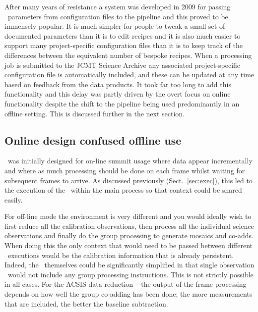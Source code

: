 \documentclass[final,authoryear,5p,times,twocolumn]{elsarticle}
\newcommand*\secref[1]{Sect.~\ref{#1}}
\begin{document}
After many years of resistance a system was developed in 2009 for
passing \recipe\ parameters from configuration files to the pipeline
and this proved to be immensely popular. It is much simpler for people
to tweak a small set of documented parameters than it is to edit
recipes and it is also much easier to support many project-specific
configuration files than it is to keep track of the differences
between the equivalent number of bespoke recipes. When a processing
job is submitted to the JCMT Science Archive any associated
project-specific configuration file is automatically included, and
these can be updated at any time based on feedback from the data
products. It took far too long to add this functionality and this
delay was partly driven by the overt focus on online functionality
despite the shift to the pipeline being used predominantly in an
offline setting. This is discussed further in the next section.

\subsection{Online design confused offline use}
\label{sec:onvoff}

\oracdr\ was initially designed for on-line summit usage where data
appear incrementally and where as much processing should be done on
each frame whilst waiting for subsequent frames to arrive. As
discussed previously (\secref{sec:exec}), this led to the
execution of the \recipe\ within the main process so that context
could be shared easily.

For off-line mode the environment is very different and you would
ideally wish to first reduce all the calibration observations, then
process all the individual science observations and finally do the
group processing to generate mosaics and co-adds. When doing this the
only context that would need to be passed between different \recipe\
executions would be the calibration information that is already
persistent. Indeed, the \recipes\ themselves could be significantly
simplified in that single observation \recipes\ would not include any
group processing instructions. This is not strictly possible in all
cases. For the ACSIS data reduction \recipes\ \citep{JennessACSISDR}
the output of the frame processing depends on how well the group
co-adding has been done; the more measurements that are included, the
better the baseline subtraction.
\end{document}
